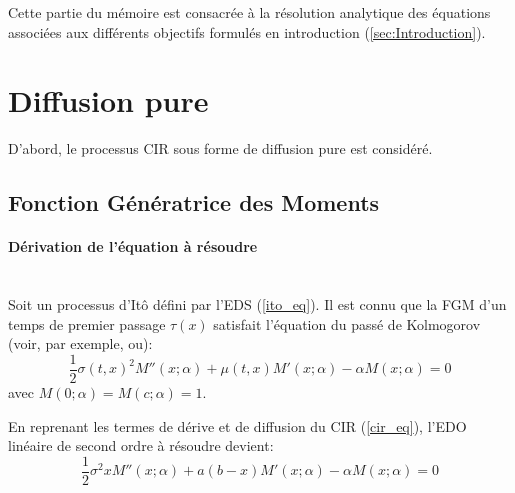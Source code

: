 \label{sec:Theme1}

Cette partie du mémoire est consacrée à la résolution analytique des équations associées aux différents objectifs formulés en introduction (\ref{sec:Introduction}).

\section{Diffusion pure}
D'abord, le processus \acs{CIR} sous forme de diffusion pure est considéré. 
\subsection{Fonction Génératrice des Moments}\label{subsection_fgm_eq}
\paragraph{Dérivation de l'équation à résoudre}\phantom{}\\
Soit un processus d'Itô défini par l'\acs{EDS} (\ref{ito_eq}).
Il est connu que la \acl{FGM} d'un temps de premier passage $\tau(x)$ satisfait l'équation du passé de Kolmogorov (voir, par exemple,\cite{cox2017} ou\cite{lefebvre2007}): 
\[
\frac{1}{2}\sigma{(t,x)}^2M''(x;\alpha)+\mu(t,x)M'(x;\alpha)-\alpha M(x;\alpha)=0
\]
avec $M(0;\alpha)=M(c;\alpha)=1$. 

En reprenant les termes de dérive et de diffusion du \acs{CIR} (\ref{cir_eq}), l'\acs{EDO} linéaire de second ordre à résoudre devient: 
\begin{equation}\label{ode_fgm}
    \frac{1}{2}\sigma^2xM''(x;\alpha)+a(b-x)M'(x;\alpha)-\alpha M(x;\alpha)=0
\end{equation}

